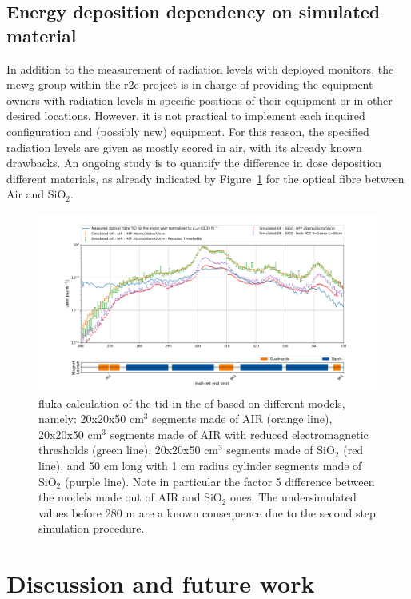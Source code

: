 \documentclass[encoding=utf8,british]{tumphthesis}
\begin{document}
\subsection{Energy deposition dependency on simulated material}

In addition to the measurement of radiation levels with deployed monitors, the \acrshort{mcwg} group within the \acrshort{r2e} project is in charge of providing the equipment owners with radiation levels in specific positions of their equipment or in other desired locations. However, it is not practical to implement each inquired configuration and (possibly new) equipment. For this reason, the specified radiation levels are given as mostly scored in air, with its already known drawbacks. An ongoing study is to quantify the difference in dose deposition different materials, as already indicated by Figure~\ref{fig:different-OF-implementations} for the optical fibre between Air and SiO$_2$.

\begin{figure}[H]
   \centering
   \includegraphics[width=\columnwidth]{results/measured_total_vs_RCC_SiO2.png}
   \caption{\acrshort{fluka} calculation of the \acrshort{tid} in the  \acrshort{of} based on different models, namely: 20x20x50 cm$^3$ segments made of AIR (orange line), 20x20x50 cm$^3$ segments made of AIR with reduced electromagnetic thresholds (green line), 20x20x50 cm$^3$ segments made of SiO$_2$ (red line), and 50 cm long with 1 cm radius cylinder segments made of SiO$_2$ (purple line). Note in particular the factor 5 difference between the models made out of AIR and SiO$_2$ ones. The undersimulated values before 280 m are a known consequence due to the second step simulation procedure.}
   \label{fig:different-OF-implementations}
\end{figure}


\section{Discussion and future work}
\label{section:discussion-future-work}
\end{document}
